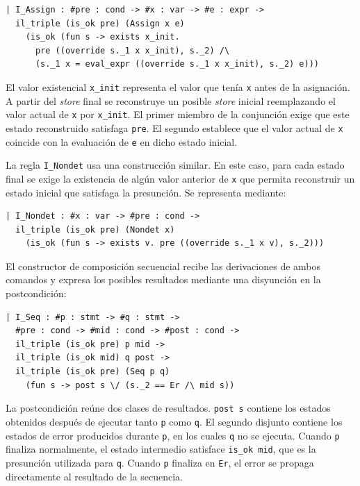 \documentclass[a4paper,	11pt]{report}
\newif\ifdraft\drafttrue
\newcommand{\comm}[3]{\ifdraft{{\color{#1}[#2: #3]}}\fi}
\newcommand{\guido}[1]{\comm{blue}{Guido}{#1}}
\begin{document}
\begin{lstlisting}
| I_Assign : #pre : cond -> #x : var -> #e : expr ->
  il_triple (is_ok pre) (Assign x e)
    (is_ok (fun s -> exists x_init.
      pre ((override s._1 x x_init), s._2) /\
      (s._1 x = eval_expr ((override s._1 x x_init), s._2) e)))
\end{lstlisting}

El valor existencial \lstinline|x_init| representa el valor que tenía \lstinline|x| antes de la asignación.
A partir del \emph{store} final se reconstruye un posible \emph{store} inicial reemplazando el valor actual de \lstinline|x| por \lstinline|x_init|.
El primer miembro de la conjunción exige que este estado reconstruido satisfaga \lstinline|pre|.
El segundo establece que el valor actual de \lstinline|x| coincide con la evaluación de \lstinline|e| en dicho estado inicial.

La regla \lstinline|I_Nondet| usa una construcción similar.
En este caso,
para cada estado final se exige la existencia de algún valor anterior de \lstinline|x| 
que permita reconstruir un estado inicial que satisfaga la presunción.
Se representa mediante:

\begin{lstlisting}
| I_Nondet : #x : var -> #pre : cond ->
  il_triple (is_ok pre) (Nondet x)
    (is_ok (fun s -> exists v. pre ((override s._1 x v), s._2)))
\end{lstlisting}

El constructor de composición secuencial recibe las derivaciones de ambos comandos
y expresa los posibles resultados mediante una disyunción en la postcondición:

\begin{lstlisting}
| I_Seq : #p : stmt -> #q : stmt ->
  #pre : cond -> #mid : cond -> #post : cond ->
  il_triple (is_ok pre) p mid ->
  il_triple (is_ok mid) q post ->
  il_triple (is_ok pre) (Seq p q)
    (fun s -> post s \/ (s._2 == Er /\ mid s))
\end{lstlisting}

La postcondición reúne dos clases de resultados.
\lstinline|post s| contiene los estados obtenidos después de ejecutar tanto \lstinline|p| como \lstinline|q|.
El segundo disjunto 
contiene los estados de error producidos durante \lstinline|p|,
en los cuales \lstinline|q| no se ejecuta.
Cuando \lstinline|p| finaliza normalmente,
el estado intermedio satisface \lstinline|is_ok mid|,
que es la presunción utilizada para \lstinline|q|.
Cuando \lstinline|p| finaliza en \lstinline|Er|,
el error se propaga directamente al resultado de la secuencia.
\end{document}
